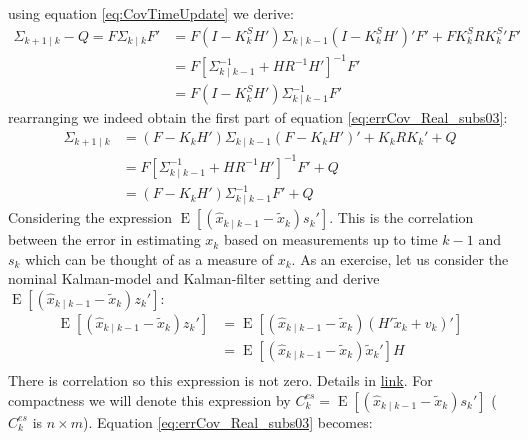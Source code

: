 \documentclass[oneside,12pt]{article}
\begin{document}
%
using equation \ref{eq:CovTimeUpdate} we derive:
%
\begin{equation}
    \begin{split}
        \Sigma_{k+1 \mid k} - Q = F\Sigma_{k \mid k}F' &= F(I - K^S_k H')\Sigma_{k \mid k-1}(I - K^S_k H')'F' + F K^S_k R K^S_k' F'\\
        &= F[\Sigma^{-1}_{k \mid k-1} + H R^{-1} H']^{-1}F'\\
        &= F(I - K^S_k H')\Sigma^{-1}_{k \mid k-1}F'
    \end{split}
\end{equation}
%
rearranging we indeed obtain the first part of equation \ref{eq:errCov_Real_subs03}:
%
\begin{equation}
    \begin{split}
        \Sigma_{k+1 \mid k} &= (F - K_k H')\Sigma_{k \mid k-1}(F - K_k H')' + K_k R K_k' + Q\\
        &= F[\Sigma^{-1}_{k \mid k-1} + H R^{-1} H']^{-1}F' + Q\\
        &= (F - K_k H')\Sigma^{-1}_{k \mid k-1}F' + Q
    \end{split}
\end{equation}
%
Considering the expression $\operatorname{E}\left[ (\hat{x}_{k \mid k-1} - \tilde{x}_k) s_k' \right]$. This is the correlation between the error in estimating $x_k$ based on measurements up to time $k-1$ and $s_k$ which can be thought of as a measure of $x_k$. As an exercise, let us consider the nominal Kalman-model and Kalman-filter setting and derive $\operatorname{E}\left[ (\hat{x}_{k \mid k-1} - \tilde{x}_k) z_k' \right]$:
%
\begin{equation}
    \begin{split}
        \operatorname{E}\left[ (\hat{x}_{k \mid k-1} - \tilde{x}_k) z_k' \right] &= \operatorname{E}\left[ (\hat{x}_{k \mid k-1} - \tilde{x}_k) (H'\tilde{x}_k + v_k)' \right]\\
        &= \operatorname{E}\left[ (\hat{x}_{k \mid k-1} - \tilde{x}_k) \tilde{x}_k' \right] H\\
    \end{split}
\end{equation}
%
There is correlation so this expression is not zero. Details in \href{https://technionmail-my.sharepoint.com/:b:/g/personal/ron_teichner_campus_technion_ac_il/EdojDf0L5y9Jvck4_f2mKiMBpLluwmcF_e2HVEbWyOI4-Q?e=BwUvb9}{link}. For compactness we will denote this expression by $C^{es}_k = \operatorname{E}\left[ (\hat{x}_{k \mid k-1} - \tilde{x}_k) s_k' \right]$ ($C^{es}_k$ is $n \times m$). Equation \ref{eq:errCov_Real_subs03} becomes:
\end{document}

